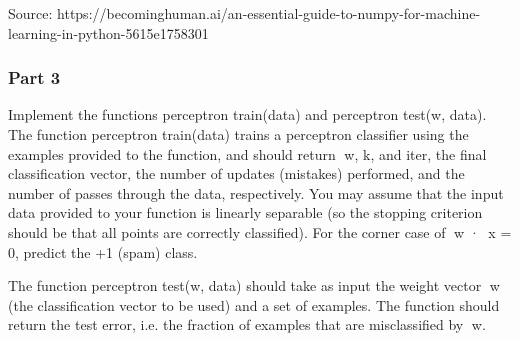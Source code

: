 \documentclass[11pt]{article}
\begin{document}
Source:
https://becominghuman.ai/an-essential-guide-to-numpy-for-machine-learning-in-python-5615e1758301

    \subsubsection{Part 3}\label{part-3}

Implement the functions perceptron train(data) and perceptron test(w,
data). The function perceptron train(data) trains a perceptron
classifier using the examples provided to the function, and should
return w, k, and iter, the final classification vector, the number of
updates (mistakes) performed, and the number of passes through the data,
respectively. You may assume that the input data provided to your
function is linearly separable (so the stopping criterion should be that
all points are correctly classified). For the corner case of w · x =
0, predict the +1 (spam) class.

The function perceptron test(w, data) should take as input the weight
vector w (the classification vector to be used) and a set of examples.
The function should return the test error, i.e. the fraction of examples
that are misclassified by w.
\end{document}
